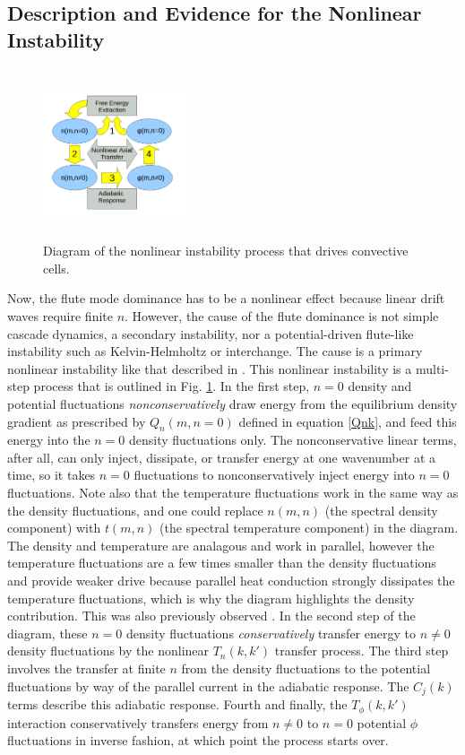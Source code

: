 \documentclass[showpacs,preprintnumbers,amsmath,amssymb,superscriptaddress]{revtex4}
\begin{document}
\subsection{Description and Evidence for the Nonlinear Instability}

\begin{figure}
\includegraphics[width=0.38\textwidth,height=50mm]{nl_instability_diagram}
\hfil
\caption{Diagram of the nonlinear instability process that drives convective cells.}
\label{nl_instability_diagram}
\end{figure}

Now, the flute mode dominance has to be a nonlinear effect because linear drift waves require finite $n$. However, the cause of the flute dominance is not simple cascade dynamics, a secondary 
instability, nor a potential-driven flute-like instability such as Kelvin-Helmholtz or interchange. The cause is a primary nonlinear instability like that described in \cite{biskamp1995,drake1995}. 
This nonlinear instability is a multi-step process that is outlined in Fig. \ref{nl_instability_diagram}.
In the first step, $n=0$ density and potential fluctuations \emph{nonconservatively} draw energy from the equilibrium density gradient as prescribed by $Q_n(m,n=0)$ defined in equation \ref{Qnk}, and feed
this energy into the $n=0$ density fluctuations only. The nonconservative linear terms, after all, can only inject, dissipate, or transfer energy at one wavenumber at a time, so it takes
$n=0$ fluctuations to nonconservatively inject energy into $n=0$ fluctuations.
Note also that the temperature fluctuations work in the same way as the density fluctuations, and one could replace $n(m,n)$ (the spectral density component)
with $t(m,n)$ (the spectral temperature component) in the diagram. The density and temperature are analagous and work in parallel, however the temperature fluctuations are a few times smaller
than the density fluctuations and provide weaker drive because parallel heat conduction strongly dissipates the temperature fluctuations, which is why the diagram highlights the density contribution.
This was also previously observed \cite{zeiler1997}.
In the second step of the diagram, these $n=0$ density fluctuations
\emph{conservatively} transfer energy to $n \ne 0$ density fluctuations by the nonlinear $T_n(k,k')$ transfer process. The third step involves the transfer at finite $n$ from the density
fluctuations to the potential fluctuations by way of the parallel current in the adiabatic response. The $C_j(k)$ terms describe this adiabatic response.
Fourth and finally, the $T_\phi(k,k')$ interaction conservatively transfers energy from
$n \ne 0$ to $n=0$ potential $\phi$ fluctuations in inverse fashion, at which point the process starts over. 
\end{document}
